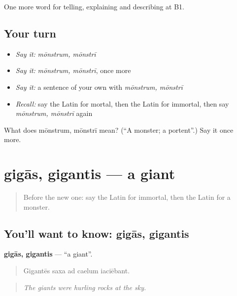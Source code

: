 \begin{grammarlens}[title={What you've built}]
One more word for telling, explaining and describing at B1.
\end{grammarlens}

\subsection*{Your turn}
\begin{itemize}
\raggedright
  \item \emph{Say it:} \emph{mōnstrum, mōnstrī}
  \item \emph{Say it:} \emph{mōnstrum, mōnstrī}, once more
  \item \emph{Say it:} a sentence of your own with \emph{mōnstrum, mōnstrī}
  \item \emph{Recall:} say the Latin for mortal, then the Latin for immortal, then say \emph{mōnstrum, mōnstrī} again
\end{itemize}

\begin{tcolorbox}[breakable,colback=teal!4,colframe=teal!35!black,title={Before you move on}]
What does mōnstrum, mōnstrī mean? (\textquotedblleft{}A monster; a portent\textquotedblright{}.) Say it once more.
\end{tcolorbox}
\section[gigās, gigantis]{gigās, gigantis — a giant}

\label{lesson:LA-C347-gigas}



\begin{quote}
Before the new one: say the Latin for immortal, then the Latin for a monster.
\end{quote}

\subsection*{You'll want to know: gigās, gigantis}
\textbf{gigās, gigantis} — \textquotedblleft{}a giant\textquotedblright{}.

\begin{quote}
Gigantēs saxa ad caelum iaciēbant.
\end{quote}

\begin{quote}
\emph{The giants were hurling rocks at the sky.}
\end{quote}

